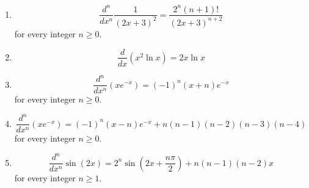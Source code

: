 \documentclass[11pt,a4paper]{article}
\begin{document}
\begin{enumerate}
\item \[ \frac{d^{n}}{dx^{n}} \frac{1}{\left(2x+3\right)^{2}} = \frac{2^{n} \left(n+1\right)!}{\left(2x+3\right)^{n+2}} \] for every integer $n \ge 0$.
\item \[ \frac{d}{dx} \left(x^{2} \ln x\right) = 2x \ln x \]
\item \[ \frac{d^{n}}{dx^{n}} \left(x e^{-x}\right) = \left(-1\right)^{n} \left(x + n\right) e^{-x} \] for every integer $n \ge 0$.
\item \[ \frac{d^{n}}{dx^{n}} \left(x e^{-x}\right) = \left(-1\right)^{n} \left(x - n\right) e^{-x} + n\left(n-1\right)\left(n-2\right)\left(n-3\right)\left(n-4\right) \] for every integer $n \ge 0$.
\item \[ \frac{d^{n}}{dx^{n}} \sin\left(2x\right) = 2^{n} \sin\left(2x + \frac{n\pi}{2}\right) + n\left(n-1\right)\left(n-2\right) x \] for every integer $n \ge 1$.
\end{enumerate}
\end{document}
